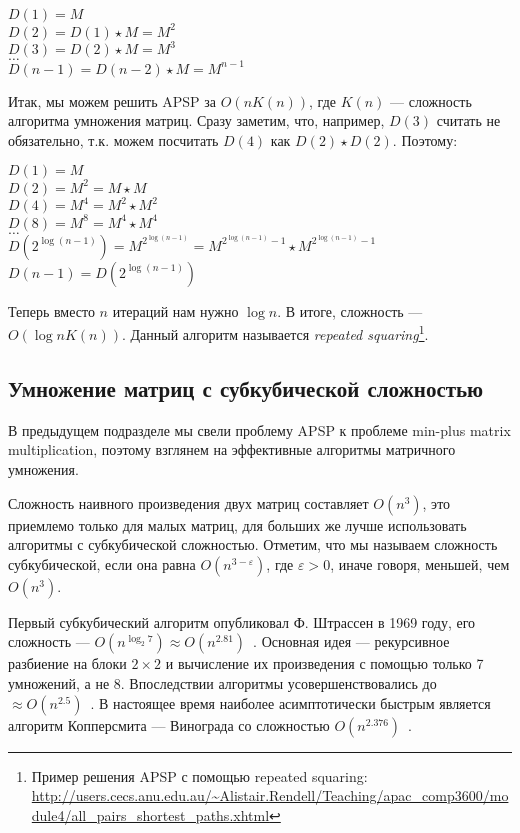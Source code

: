 \begin{center}
    $D(1) = M$ \\
    $D(2) = D(1) \star M = M^2$ \\
    $D(3) = D(2) \star M = M^3$ \\
    $\dots$ \\
    $D(n-1) = D(n-2) \star M = M^{n-1}$ \\
\end{center}

Итак, мы можем решить APSP за $O(n K(n))$, где $K(n)$ --- сложность алгоритма умножения матриц.
Сразу заметим, что, например, $D(3)$ считать не обязательно, т.к. можем посчитать $D(4)$ как $D(2) \star D(2)$.
Поэтому:

\begin{center}
    $D(1) = M$ \\
    $D(2) = M^2 = M \star M$ \\
    $D(4) = M^4 = M^2 \star M^2$ \\
    $D(8) = M^8 = M^4 \star M^4$ \\
    $\dots$ \\
    $D(2^{\log(n-1)}) = M^{2^{\log(n-1)}} = M^{2^{\log(n-1)} - 1} \star M^{2^{\log(n-1)} - 1}$ \\
    $D(n-1) = D(2^{\log(n-1)})$ \\
\end{center}

Теперь вместо $n$ итераций нам нужно $\log{n}$. В итоге, сложность --- $O(\log{n} K(n))$.
Данный алгоритм называется \textit{repeated squaring}\footnote{Пример решения APSP с помощью repeated squaring: \url{http://users.cecs.anu.edu.au/~Alistair.Rendell/Teaching/apac_comp3600/module4/all_pairs_shortest_paths.xhtml}}.

\subsection{Умножение матриц с субкубической сложностью}
В предыдущем подразделе мы свели проблему APSP к проблеме min-plus matrix multiplication, поэтому взглянем на эффективные алгоритмы матричного умножения.

Сложность наивного произведения двух матриц составляет $O(n^3)$, это приемлемо только для малых матриц, для больших же лучше использовать алгоритмы с субкубической сложностью. 
Отметим, что мы называем сложность субкубической, если она равна $O(n^{3-\varepsilon})$, где $\varepsilon > 0$, иначе говоря, меньшей, чем $O(n^3)$.

Первый субкубический алгоритм опубликовал Ф. Штрассен в 1969 году, его сложность --- $O(n^{\log_2 7}) \approx O(n^{2.81})$~\cite{Strassen1969}. Основная идея --- рекурсивное разбиение на блоки $2 \times 2$ и вычисление их произведения с помощью только 7 умножений, а не 8.
Впоследствии алгоритмы усовершенствовались до ${\approx} O(n^{2.5})$~\cite{Pan1978,BiniCapoRoma1979,Schonhage1981,CoppWino1982}. В настоящее время наиболее асимптотически быстрым является алгоритм Копперсмита --- Винограда со сложностью $O(n^{2.376})$~\cite{CoppWino1990}.

